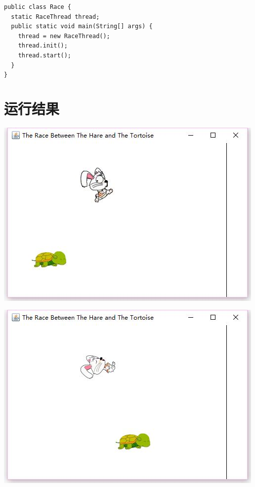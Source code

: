 \documentclass[11pt, a4paper]{article}
\begin{document}
\begin{CJK*}{UTF8}{gbsn}
\begin{lstlisting}
public class Race {
  static RaceThread thread;
  public static void main(String[] args) {
    thread = new RaceThread();
    thread.init();
    thread.start();
  }
}
  \end{lstlisting}

  \section{运行结果}


  \begin{center}
    \includegraphics{result1.jpg}
  \end{center}

  \begin{center}
    \includegraphics{result2.jpg}
  \end{center}


\end{CJK*}
\end{document}
